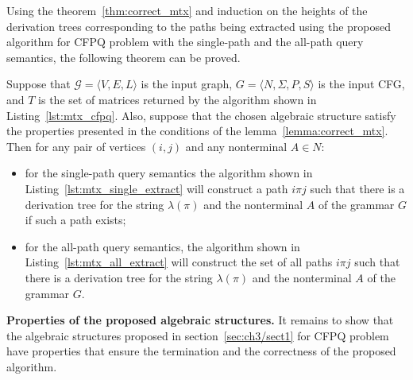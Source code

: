 Using the theorem~\ref{thm:correct_mtx} and induction on the heights of the derivation trees corresponding to the paths being extracted using the proposed algorithm for CFPQ problem with the single-path and the all-path query semantics, the following theorem can be proved.

\begin{theorem}\label{thm:correct_extraction_single_all_mtx}
Suppose that $\mathcal{G} = \langle V, E, L \rangle$ is the input graph, $G =\langle N, \Sigma, P, S \rangle$ is the input CFG, and $T$ is the set of matrices returned by the algorithm shown in Listing~\ref{lst:mtx_cfpq}. Also, suppose that the chosen algebraic structure satisfy the properties presented in the conditions of the lemma~\ref{lemma:correct_mtx}. Then for any pair of vertices $(i, j)$ and any nonterminal $A \in N$:
	\begin{itemize}
	    \item for the single-path query semantics the algorithm shown in Listing~\ref{lst:mtx_single_extract} will construct a path $i \pi j$ such that there is a derivation tree for the string $\lambda(\pi)$ and the nonterminal $A$ of the grammar $G$ if such a path exists;
	    \item for the all-path query semantics, the algorithm shown in Listing~\ref{lst:mtx_all_extract} will construct the set of all paths $i \pi j$ such that there is a derivation tree for the string $\lambda(\pi)$ and the nonterminal $A$ of the grammar $G$.
	\end{itemize}
\end{theorem}

\textbf{Properties of the proposed algebraic structures.} %
It remains to show that the algebraic structures proposed in section~\ref{sec:ch3/sect1} for CFPQ problem have properties that ensure the termination and the correctness of the proposed algorithm.

